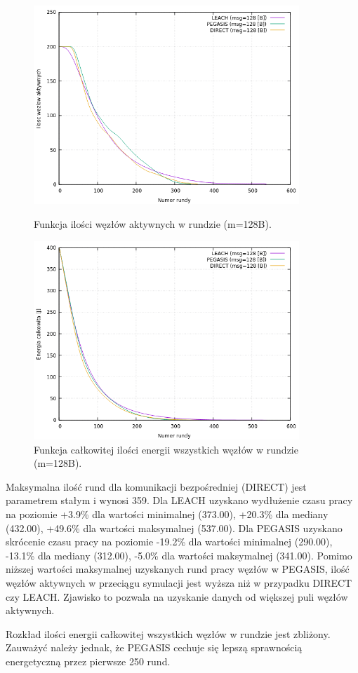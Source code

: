 \documentclass[a4paper,12pt,twoside,openany]{report}
\begin{document}
\begin{figure}[H]
 \centering
 \includegraphics[width=10cm]{images/gnuplot/test_1/nodes_in_round_m128.png}
 \caption{Funkcja ilości węzłów aktywnych w rundzie (m=128B).}
 \includegraphics[width=10cm]{images/gnuplot/test_1/energy_in_round_m128.png}
 \caption{Funkcja całkowitej ilości energii wszystkich węzłów w rundzie (m=128B).}
\end{figure}

\par
Maksymalna ilość rund dla komunikacji bezpośredniej (DIRECT) jest parametrem stałym i wynosi 359.
Dla LEACH uzyskano wydłużenie czasu pracy na poziomie +3.9\% dla wartości minimalnej (373.00), +20.3\% dla mediany (432.00), +49.6\% dla wartości maksymalnej (537.00).
Dla PEGASIS uzyskano skrócenie czasu pracy na poziomie -19.2\% dla wartości minimalnej (290.00), -13.1\% dla mediany (312.00), -5.0\% dla wartości maksymalnej (341.00).
Pomimo niższej wartości maksymalnej uzyskanych rund pracy węzłów w PEGASIS, ilość węzłów aktywnych w przeciągu symulacji jest wyższa niż w przypadku DIRECT czy LEACH.
Zjawisko to pozwala na uzyskanie danych od większej puli węzłów aktywnych.
\par
Rozkład ilości energii całkowitej wszystkich węzłów w rundzie jest zbliżony.
Zauważyć należy jednak, że PEGASIS cechuje się lepszą sprawnością energetyczną przez pierwsze 250 rund.
\end{document}
